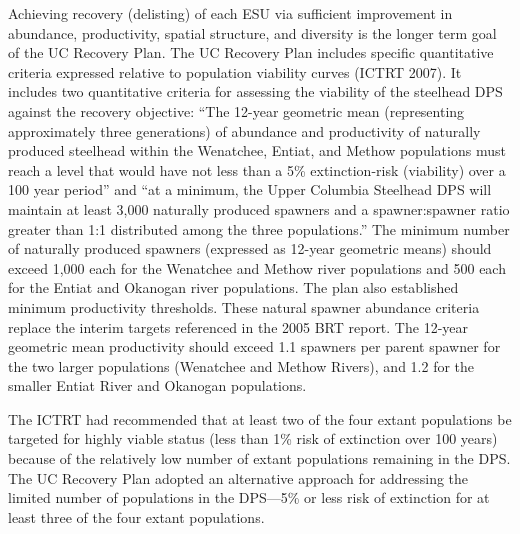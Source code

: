 \documentclass[
  letterpaper,
  oneside,
  open=any]{scrbook}
\begin{document}
Achieving recovery (delisting) of each ESU via sufficient improvement in
abundance, productivity, spatial structure, and diversity is the longer
term goal of the UC Recovery Plan. The UC Recovery Plan includes
specific quantitative criteria expressed relative to population
viability curves (ICTRT 2007). It includes two quantitative criteria for
assessing the viability of the steelhead DPS against the recovery
objective: ``The 12-year geometric mean (representing approximately
three generations) of abundance and productivity of naturally produced
steelhead within the Wenatchee, Entiat, and Methow populations must
reach a level that would have not less than a 5\% extinction-risk
(viability) over a 100 year period'' and ``at a minimum, the Upper
Columbia Steelhead DPS will maintain at least 3,000 naturally produced
spawners and a spawner:spawner ratio greater than 1:1 distributed among
the three populations.'' The minimum number of naturally produced
spawners (expressed as 12-year geometric means) should exceed 1,000 each
for the Wenatchee and Methow river populations and 500 each for the
Entiat and Okanogan river populations. The plan also established minimum
productivity thresholds. These natural spawner abundance criteria
replace the interim targets referenced in the 2005 BRT report. The
12-year geometric mean productivity should exceed 1.1 spawners per
parent spawner for the two larger populations (Wenatchee and Methow
Rivers), and 1.2 for the smaller Entiat River and Okanogan populations.

The ICTRT had recommended that at least two of the four extant
populations be targeted for highly viable status (less than 1\% risk of
extinction over 100 years) because of the relatively low number of
extant populations remaining in the DPS. The UC Recovery Plan adopted an
alternative approach for addressing the limited number of populations in
the DPS---5\% or less risk of extinction for at least three of the four
extant populations.
\end{document}
